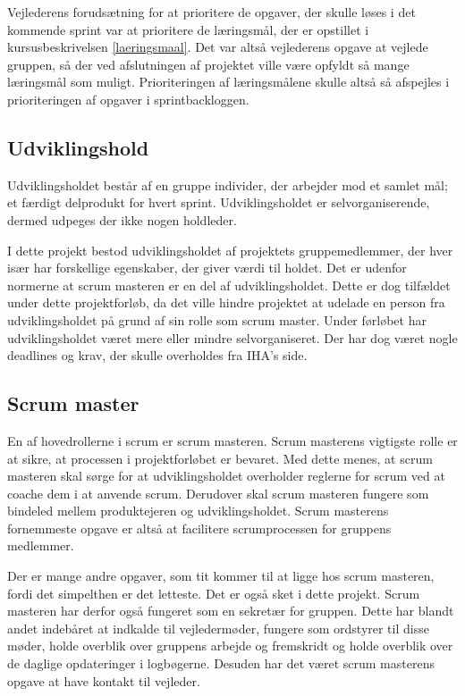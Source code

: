 Vejlederens forudsætning for at prioritere de opgaver, der skulle løses i det kommende sprint var at prioritere de læringsmål, der er opstillet i kursusbeskrivelsen \ref{laeringsmaal}. Det var altså vejlederens opgave at vejlede gruppen, så der ved afslutningen af projektet ville være opfyldt så mange læringsmål som muligt. Prioriteringen af læringsmålene skulle altså så afspejles i prioriteringen af opgaver i sprintbackloggen. 

\subsection{Udviklingshold}
Udviklingsholdet består af en gruppe individer, der arbejder mod et samlet mål; et færdigt delprodukt for hvert sprint. Udviklingsholdet er selvorganiserende, dermed udpeges der ikke nogen holdleder.

I dette projekt bestod udviklingsholdet af projektets gruppemedlemmer, der hver især har forskellige egenskaber, der giver værdi til holdet. Det er udenfor normerne at scrum masteren er en del af udviklingsholdet. Dette er dog tilfældet under dette projektforløb, da det ville hindre projektet at udelade en person fra udviklingsholdet på grund af sin rolle som scrum master.
Under førløbet har udviklingsholdet været mere eller mindre selvorganiseret. Der har dog været nogle deadlines og krav, der skulle overholdes fra IHA's side.

\subsection{Scrum master}
En af hovedrollerne i scrum er scrum masteren. Scrum masterens vigtigste rolle er at sikre, at processen i projektforløbet er bevaret. Med dette menes, at scrum masteren skal sørge for at udviklingsholdet overholder reglerne for scrum ved at coache dem i at anvende scrum. Derudover skal scrum masteren fungere som bindeled mellem produktejeren og udviklingsholdet. Scrum masterens fornemmeste opgave er altså at facilitere scrumprocessen for gruppens medlemmer. 

Der er mange andre opgaver, som tit kommer til at ligge hos scrum masteren, fordi det simpelthen er det letteste. Det er også sket i dette projekt. Scrum masteren har derfor også fungeret som en sekretær for gruppen. Dette har blandt andet indebåret at indkalde til vejledermøder, fungere som ordstyrer til disse møder, holde overblik over gruppens arbejde og fremskridt og holde overblik over de daglige opdateringer i logbøgerne. Desuden har det været scrum masterens opgave at have kontakt til vejleder. 

